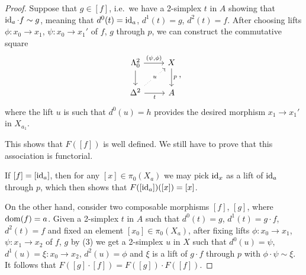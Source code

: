 \documentclass[a4paper,11pt,openany]{scrartcl}
\begin{document}
\begin{proof}
    Suppose that $g\in [f]$, i.e.\ we have a 2-simplex $t$ in $A$ showing that
    $\operatorname{id}_a\cdot f\sim g$, meaning that $d^0(t)=\operatorname{id}_a$, $d^1(t)=g$, $d^2(t)=f$.
    After choosing lifts $\phi\colon x_0\rightarrow x_1$, $\psi\colon
    x_0\rightarrow x_1'$ of $f$, $g$ through $p$, we can construct the
    commutative square
    \[\begin{tikzcd}
        {\Lambda^2_0} & X \\
        {\Delta^2} & A
        \arrow["{(\psi,\phi)}", from=1-1, to=1-2]
        \arrow[from=1-1, to=2-1]
        \arrow["t"', from=2-1, to=2-2]
        \arrow["p", from=1-2, to=2-2]
        \arrow["u"{description}, dotted, from=2-1, to=1-2]
    \end{tikzcd},\]
    where the lift $u$ is such that $d^0(u)=h$ provides the desired morphism
    $x_1\rightarrow x_1'$ in $X_{a_1}$.

    This shows that $F([f])$ is well defined. We still have to prove that this
    association is functorial.

    If $[f]=[\operatorname{id}_a]$, then for any $[x]\in\pi_0(X_a)$ we may pick $\operatorname{id}_x$ as a
    lift of $\operatorname{id}_a$ through $p$, which then shows that $F([\operatorname{id}_a])([x])=[x]$.

    On the other hand, consider two composable morphisms $[f]$, $[g]$, where
    $\operatorname{dom}(f)=a$. Given a
    2-simplex $t$ in $A$ such that $d^0(t)=g$, $d^1(t)=g\cdot f$, $d^2(t)=f$ and
    fixed an element $[x_0]\in\pi_0(X_a)$, after fixing lifts $\phi\colon
    x_0\rightarrow x_1$, $\psi\colon x_1\rightarrow x_2$ of $f$, $g$ by (3) we
    get a 2-simplex $u$ in $X$
    such that $d^0(u)=\psi$, $d^1(u)=\xi\colon x_0\rightarrow x_2$,
    $d^2(u)=\phi$ and $\xi$ is a lift of $g\cdot f$ through $p$ with
    $\phi\cdot\psi\sim\xi$. It follows that $F([g]\cdot [f])=F([g])\cdot
    F([f])$.
\end{proof}
\end{document}
